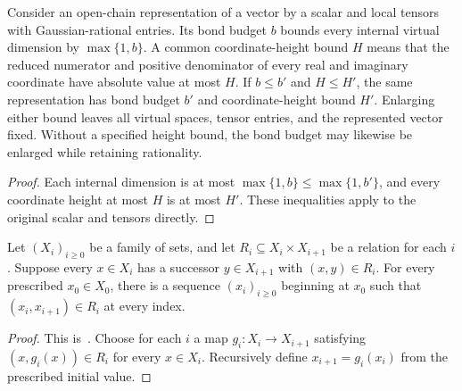 \begin{lemma}
    \label{lem:lvv_rational_representation_monotone}
    \leanok
    Consider an open-chain representation of a vector by a scalar and
    local tensors with Gaussian-rational entries. Its bond budget $b$
    bounds every internal virtual dimension by $\max\{1,b\}$.
    A common coordinate-height bound $H$ means that the reduced numerator
    and positive denominator of every real and imaginary coordinate have
    absolute value at most $H$.
    If $b\le b'$ and $H\le H'$, the same representation has bond budget
    $b'$ and coordinate-height bound $H'$. Enlarging either bound leaves
    all virtual spaces, tensor entries, and the represented vector fixed.
    Without a specified height bound, the bond budget may likewise be
    enlarged while retaining rationality.
\end{lemma}
\begin{proof}\leanok
    Each internal dimension is at most $\max\{1,b\}\le\max\{1,b'\}$,
    and every coordinate height at most $H$ is at most $H'$.
    These inequalities apply to the original scalar and tensors directly.
\end{proof}

\begin{lemma}
    \label{lem:dependent_sequence_choice}
    \leanok
    Let $(X_i)_{i\ge0}$ be a family of sets, and let
    $R_i\subseteq X_i\times X_{i+1}$ be a relation for each $i$.
    Suppose every $x\in X_i$ has a successor $y\in X_{i+1}$ with
    $(x,y)\in R_i$. For every prescribed $x_0\in X_0$, there is a sequence
    $(x_i)_{i\ge0}$ beginning at $x_0$ such that
    $(x_i,x_{i+1})\in R_i$ at every index.
\end{lemma}
\begin{proof}\leanok
    This is~\cite[``Sequences with prescribed successive
        relations'']{QICLean2026Blueprint}.
    Choose for each $i$ a map $g_i:X_i\to X_{i+1}$ satisfying
    $(x,g_i(x))\in R_i$ for every $x\in X_i$.
    Recursively define $x_{i+1}=g_i(x_i)$ from the prescribed initial value.
\end{proof}

